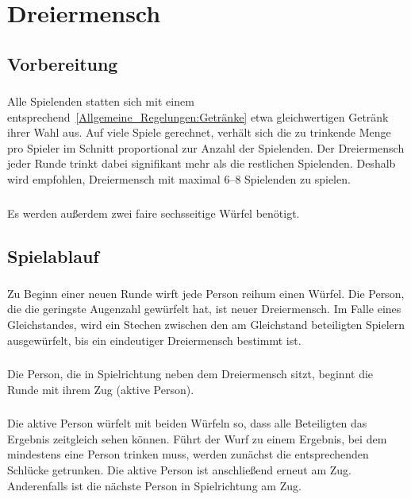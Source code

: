 \section{Dreiermensch}

\subsection{Vorbereitung}
\subsubsection{}
Alle Spielenden statten sich mit einem entsprechend~\ref{Allgemeine_Regelungen:Getränke} etwa gleichwertigen Getränk ihrer Wahl aus.
Auf viele Spiele gerechnet, verhält sich die zu trinkende Menge pro Spieler im Schnitt proportional zur Anzahl der Spielenden.
Der Dreiermensch jeder Runde trinkt dabei signifikant mehr als die restlichen Spielenden.
Deshalb wird empfohlen, Dreiermensch mit maximal 6--8 Spielenden zu spielen.

\subsubsection{}
Es werden außerdem zwei faire sechsseitige Würfel benötigt.

\subsection{Spielablauf}
\subsubsection{}\label{Dreiermensch:Spielablauf:NeueRunde}
Zu Beginn einer neuen Runde wirft jede Person reihum einen Würfel.
Die Person, die die geringste Augenzahl gewürfelt hat, ist neuer Dreiermensch.
Im Falle eines Gleichstandes, wird ein Stechen zwischen den am Gleichstand beteiligten Spielern ausgewürfelt, bis ein eindeutiger Dreiermensch bestimmt ist.

\subsubsection{}
Die Person, die in Spielrichtung neben dem Dreiermensch sitzt, beginnt die Runde mit ihrem Zug (\glqq{}aktive Person\grqq{}).

\subsubsection{}
Die aktive Person würfelt mit beiden Würfeln so, dass alle Beteiligten das Ergebnis zeitgleich sehen können.
Führt der Wurf zu einem Ergebnis, bei dem mindestens eine Person trinken muss, werden zunächst die entsprechenden Schlücke getrunken.
Die aktive Person ist anschließend erneut am Zug.
Anderenfalls ist die nächste Person in Spielrichtung am Zug.

